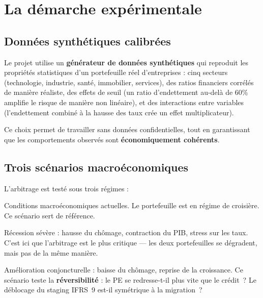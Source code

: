 \documentclass[12pt,a4paper]{article}
\begin{document}
\section{La démarche expérimentale}

\subsection{Données synthétiques calibrées}

Le projet utilise un \textbf{générateur de données synthétiques} qui reproduit les propriétés statistiques d'un portefeuille réel d'entreprises : cinq secteurs (technologie, industrie, santé, immobilier, services), des ratios financiers corrélés de manière réaliste, des effets de seuil (un ratio d'endettement au-delà de 60\% amplifie le risque de manière non linéaire), et des interactions entre variables (l'endettement combiné à la hausse des taux crée un effet multiplicateur).

Ce choix permet de travailler sans données confidentielles, tout en garantissant que les comportements observés sont \textbf{économiquement cohérents}.

\subsection{Trois scénarios macroéconomiques}

L'arbitrage est testé sous trois régimes :

\begin{description}[style=nextline, leftmargin=1.5cm]
  \item[Scénario de base] Conditions macroéconomiques actuelles. Le portefeuille est en régime de croisière. Ce scénario sert de référence.
  \item[Scénario adverse] Récession sévère : hausse du chômage, contraction du PIB, stress sur les taux. C'est ici que l'arbitrage est le plus critique --- les deux portefeuilles se dégradent, mais pas de la même manière.
  \item[Scénario de reprise] Amélioration conjoncturelle : baisse du chômage, reprise de la croissance. Ce scénario teste la \textbf{réversibilité} : le PE se redresse-t-il plus vite que le crédit~? Le déblocage du staging IFRS~9 est-il symétrique à la migration~?
\end{description}
\end{document}
